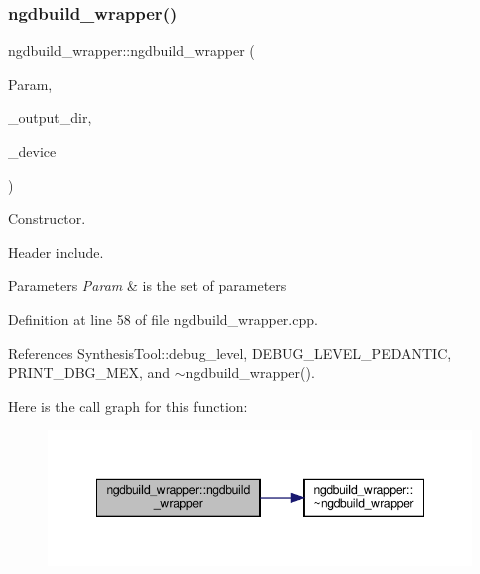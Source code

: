 \subsubsection{\texorpdfstring{ngdbuild\+\_\+wrapper()}{ngdbuild\_wrapper()}}
{\footnotesize\ttfamily ngdbuild\+\_\+wrapper\+::ngdbuild\+\_\+wrapper (\begin{DoxyParamCaption}\item[{const \hyperlink{Parameter_8hpp_a37841774a6fcb479b597fdf8955eb4ea}{Parameter\+Const\+Ref} \&}]{Param,  }\item[{const std\+::string \&}]{\+\_\+output\+\_\+dir,  }\item[{const \hyperlink{target__device_8hpp_acedb2b7a617e27e6354a8049fee44eda}{target\+\_\+device\+Ref} \&}]{\+\_\+device }\end{DoxyParamCaption})}



Constructor. 

Header include.


\begin{DoxyParams}{Parameters}
{\em Param} & is the set of parameters \\
\hline
\end{DoxyParams}


Definition at line 58 of file ngdbuild\+\_\+wrapper.\+cpp.



References Synthesis\+Tool\+::debug\+\_\+level, D\+E\+B\+U\+G\+\_\+\+L\+E\+V\+E\+L\+\_\+\+P\+E\+D\+A\+N\+T\+IC, P\+R\+I\+N\+T\+\_\+\+D\+B\+G\+\_\+\+M\+EX, and $\sim$ngdbuild\+\_\+wrapper().

Here is the call graph for this function\+:
\nopagebreak
\begin{figure}[H]
\begin{center}
\leavevmode
\includegraphics[width=348pt]{de/d59/classngdbuild__wrapper_a24d1db56f6ac9df37c9fba5edbaa170b_cgraph}
\end{center}
\end{figure}
\mbox{\label{classngdbuild__wrapper_a2ada66a145fed585a78fd7f87363f50f}} 
